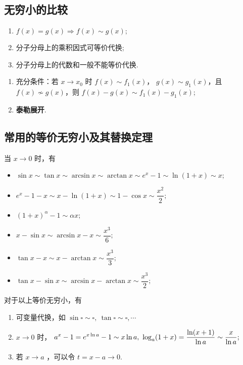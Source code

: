 \subsection{无穷小的比较}
\begin{enumerate}
    \item $ f(x)=g(x)\Rightarrow f(x)\sim g(x); $
    \item 分子分母上的乘积因式可等价代换;
    \item 分子分母上的代数和一般不能等价代换.
\end{enumerate}

\begin{Field}[代数和求等价]
\begin{enumerate}
    \item 充分条件：若 $ x\rightarrow x_0 $ 时 $ f(x)\sim f_1(x) $，
    $ g(x)\sim g_1(x) $，且$ f(x)\nsim g(x) $，则 $ f(x)-g(x)\sim f_1(x)-g_1(x) $;
    \item \textbf{泰勒展开}.    
\end{enumerate}
\end{Field}

\subsection{常用的等价无穷小及其替换定理}

当 $ x\rightarrow0 $ 时，有

\begin{itemize}
    \item $ \sin x \sim \tan x \sim \arcsin x \sim \arctan x \sim e^x - 1 \sim \ln(1+x) \sim x; $ 
    \item $ e^x - 1 -x \sim x - \ln(1+x) \sim 1 - \cos x \sim \dfrac{x^2}{2}; $ 
    \item $ (1+x)^{\alpha}-1\sim \alpha x;$
    \item $ x - \sin x \sim \arcsin x - x \sim \dfrac{x^3}{6};$ 
    \item $ \tan x - x \sim x - \arctan x \sim \dfrac{x^3}{3};$ 
    \item $ \tan x - \sin x \sim \arcsin x - \arctan x \sim \dfrac{x^3}{2}; $ 
\end{itemize}

对于以上等价无穷小，有

\begin{enumerate}
    \item 可变量代换，如 $ \sin \square \sim \square,\ \tan \square \sim \square,\cdots $ 
    \item $ x\rightarrow0 $ 时，
    $\dis a^x-1=e^{x\ln a} -1\sim x\ln a,\ \log_a(1+x)=\frac{\ln(x+1)}{\ln a}\sim \frac{x}{\ln a};$
    \item 若 $ x\rightarrow a $ ，可以令 $ t = x - a \rightarrow 0. $ 
\end{enumerate}

